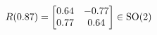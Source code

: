 \documentclass[preview]{standalone}
\begin{document}
\begin{align*}
\special{dvisvgm:raw <g id='unique000'>}R(0.87) = \begin{bmatrix} 0.64 & -0.77 \\ 0.77 & 0.64 \end{bmatrix} \in \text{SO}(2)\special{dvisvgm:raw </g>}
\end{align*}
\end{document}

